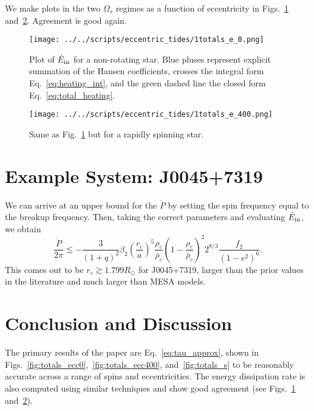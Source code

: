 \documentclass[
        fleqn,
        usenatbib,
        referee,
    ]{mnras}
\begin{document}
We make plots in the two $\Omega_s$ regimes as a function of eccentricity in
Figs.~\ref{fig:e0} and~\ref{fig:e400}. Agreement is good again.
\begin{figure}
    \centering
    \texttt{[image: ../../scripts/eccentric\_tides/1totals\_e\_0.png]}
    \caption{Plot of $\dot{E}_{\rm in}$ for a non-rotating star. Blue pluses
    represent explicit summation of the Hansen coefficients, crosses the
    integral form Eq.~\eqref{eq:heating_int}, and the green dashed line the
    closed form Eq.~\eqref{eq:total_heating}.}\label{fig:e0}
\end{figure}
\begin{figure}
    \centering
    \texttt{[image: ../../scripts/eccentric\_tides/1totals\_e\_400.png]}
    \caption{Same as Fig.~\ref{fig:e0} but for a rapidly spinning
    star.}\label{fig:e400}
\end{figure}

\section{Example System: J0045+7319}\label{s:j00457319}

We can arrive at an upper bound for the $\dot{P}$ by setting the spin frequency
equal to the breakup frequency. Then, taking the correct parameters and
evaluating $\dot{E}_{\rm in}$, we obtain
\begin{equation}
    \frac{\dot{P}}{2\pi} \lesssim
        -\frac{3}{(1 + q)^2}\beta_2 \left(\frac{r_c}{a}\right)^5
        \frac{\rho_c}{\bar{\rho}_c} \left(1 -
        \frac{\rho_c}{\bar{\rho}_c}\right)^2 2^{8/3}\frac{f_2}{(1 - e^2)^6}.
\end{equation}
This comes out to be $r_c \gtrsim 1.799R_{\odot}$ for J0045+7319, larger than
the prior values in the literature and much larger than MESA models.

\section{Conclusion and Discussion}\label{s:disc}

The primary results of the paper are Eq.~\eqref{eq:tau_approx}, shown in
Figs.~\ref{fig:totals_ecc0},~\ref{fig:totals_ecc400},
and~\ref{fig:totals_s} to be reasonably accurate across a range of spins
and eccentricities. The energy dissipation rate is also computed using similar
techniques and show good agreement (see Figs.~\ref{fig:e0}
and~\ref{fig:e400}).
\end{document}
